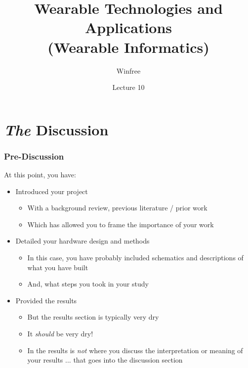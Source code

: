 \documentclass[aspectratio=169]{beamer} %
\title[INF632 (EE499/EE599)]{Wearable Technologies and Applications\\(Wearable Informatics)} %
\author{Winfree}
\date{Lecture 10}
\begin{document}
	\maketitle



\section{{\em The} Discussion}
	\begin{frame}
		\frametitle{Pre-Discussion}
		At this point, you have:
		\begin{itemize}
			\item Introduced your project
			\begin{itemize}
				\item With a background review, previous literature / prior work
				\item Which has allowed you to frame the importance of your work
			\end{itemize}
			\item Detailed your hardware design and methods
			\begin{itemize}
				\item In this case, you have probably included schematics and descriptions of what you have built
				\item And, what steps you took in your study
			\end{itemize}
			\item Provided the results
			\begin{itemize}
				\item But the results section is typically very dry
				\item It {\em should} be very dry!
				\item In the results is {\em not} where you discuss the interpretation or meaning of your results ... that goes into the discussion section
			\end{itemize}
		\end{itemize}
	\end{frame}
\end{document}
